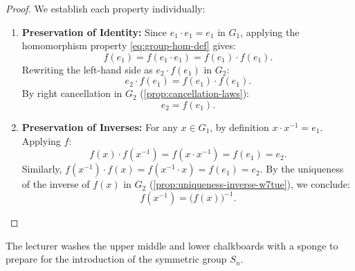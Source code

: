 \begin{content}

\begin{proof}
We establish each property individually:
\begin{enumerate}[label=\textbf{(\arabic*)}]
    \item \textbf{Preservation of Identity:}
    Since $e_1 \cdot e_1 = e_1$ in $G_1$, applying the homomorphism property \eqref{eq:group-hom-def} gives:
    \[
    f(e_1) = f(e_1 \cdot e_1) = f(e_1) \cdot f(e_1).
    \]
    Rewriting the left-hand side as $e_2 \cdot f(e_1)$ in $G_2$:
    \[
    e_2 \cdot f(e_1) = f(e_1) \cdot f(e_1).
    \]
    By right cancellation in $G_2$ (\cref{prop:cancellation-laws}):
    \[
    e_2 = f(e_1).
    \]
    \item \textbf{Preservation of Inverses:}
    For any $x \in G_1$, by definition $x \cdot x^{-1} = e_1$. Applying $f$:
    \[
    f(x) \cdot f(x^{-1}) = f(x \cdot x^{-1}) = f(e_1) = e_2.
    \]
    Similarly, $f(x^{-1}) \cdot f(x) = f(x^{-1} \cdot x) = f(e_1) = e_2$.
    By the uniqueness of the inverse of $f(x)$ in $G_2$ (\cref{prop:uniqueness-inverse-w7tue}), we conclude:
    \[
    f(x^{-1}) = \bigl(f(x)\bigr)^{-1}.
    \]
\end{enumerate}
\end{proof}
\end{content}

\begin{hidden}
\end{hidden}

\begin{note}
The lecturer washes the upper middle and lower chalkboards with a sponge to prepare for the introduction of the symmetric group $S_n$.
\end{note}

